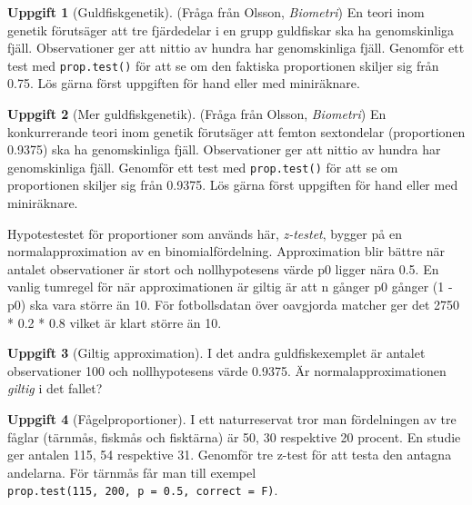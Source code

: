 \documentclass[
]{book}
\theoremstyle{definition}
\theoremstyle{definition}
\theoremstyle{definition}
\newtheorem{exercise}{Uppgift}[chapter]
\theoremstyle{definition}
\theoremstyle{remark}
\begin{document}
\begin{exercise}[Guldfiskgenetik]
(Fråga från Olsson, \emph{Biometri}) En teori inom genetik förutsäger att tre fjärdedelar i en grupp guldfiskar ska ha genomskinliga fjäll. Observationer ger att nittio av hundra har genomskinliga fjäll. Genomför ett test med \texttt{prop.test()} för att se om den faktiska proportionen skiljer sig från 0.75. Lös gärna först uppgiften för hand eller med miniräknare.
\end{exercise}

\begin{exercise}[Mer guldfiskgenetik]
(Fråga från Olsson, \emph{Biometri}) En konkurrerande teori inom genetik förutsäger att femton sextondelar (proportionen 0.9375) ska ha genomskinliga fjäll. Observationer ger att nittio av hundra har genomskinliga fjäll. Genomför ett test med \texttt{prop.test()} för att se om proportionen skiljer sig från 0.9375. Lös gärna först uppgiften för hand eller med miniräknare.
\end{exercise}

Hypotestestet för proportioner som används här, \emph{z-testet}, bygger på en normalapproximation av en binomialfördelning. Approximation blir bättre när antalet observationer är stort och nollhypotesens värde p0 ligger nära 0.5. En vanlig tumregel för när approximationen är giltig är att n gånger p0 gånger (1 - p0) ska vara större än 10. För fotbollsdatan över oavgjorda matcher ger det 2750 * 0.2 * 0.8 vilket är klart större än 10.

\begin{exercise}[Giltig approximation]
I det andra guldfiskexemplet är antalet observationer 100 och nollhypotesens värde 0.9375. Är normalapproximationen \emph{giltig} i det fallet?
\end{exercise}

\begin{exercise}[Fågelproportioner]
I ett naturreservat tror man fördelningen av tre fåglar (tärnmås, fiskmås och fisktärna) är 50, 30 respektive 20 procent. En studie ger antalen 115, 54 respektive 31. Genomför tre z-test för att testa den antagna andelarna. För tärnmås får man till exempel \texttt{prop.test(115,\ 200,\ p\ =\ 0.5,\ correct\ =\ F)}.
\end{exercise}
\end{document}
